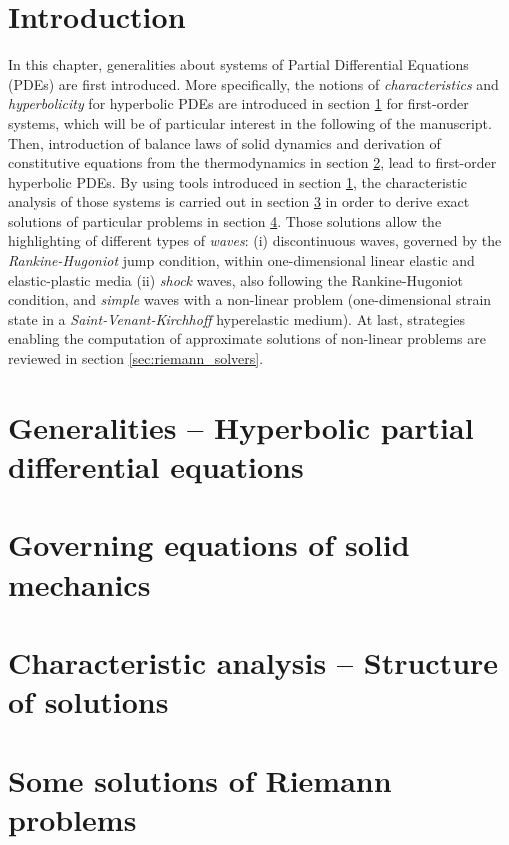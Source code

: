 \section*{Introduction}
In this chapter, generalities about systems of Partial Differential Equations (PDEs) are first introduced. More specifically, the notions of \textit{characteristics} and \textit{hyperbolicity} for hyperbolic PDEs are introduced in section \ref{sec:PDEs} for first-order systems, which will be of particular interest in the following of the manuscript.
Then, introduction of balance laws of solid dynamics and derivation of constitutive equations from the thermodynamics in section \ref{sec:solidMech_equations}, lead to first-order hyperbolic PDEs.
By using tools introduced in section \ref{sec:PDEs}, the characteristic analysis of those systems is carried out in section \ref{sec:characteristic_analysis} in order to derive exact solutions of particular problems in section \ref{sec:riemann_problems}. Those solutions allow the highlighting of different types of \textit{waves}: (i) discontinuous waves, governed by the \textit{Rankine-Hugoniot} jump condition, within one-dimensional linear elastic and elastic-plastic media (ii) \textit{shock} waves, also following the Rankine-Hugoniot condition, and \textit{simple} waves with a non-linear problem (one-dimensional strain state in a \textit{Saint-Venant-Kirchhoff} hyperelastic medium).
At last, strategies enabling the computation of approximate solutions of non-linear problems are reviewed in section \ref{sec:riemann_solvers}.


\section{Generalities -- Hyperbolic partial differential equations}
\label{sec:PDEs}


\section{Governing equations of solid mechanics}
\label{sec:solidMech_equations}



\section{Characteristic analysis -- Structure of solutions}
\label{sec:characteristic_analysis}


\section{Some solutions of Riemann problems}
\label{sec:riemann_problems}

